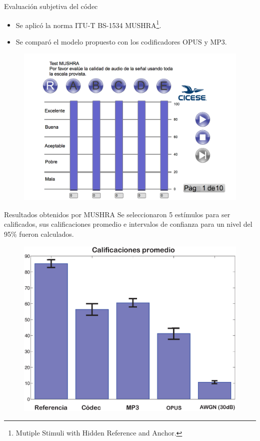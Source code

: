 \documentclass[xcolor=table]{beamer}
\begin{document}
\begin{frame}{Evaluaci\'on subjetiva del c\'odec}
	\begin{itemize}
		\item<2-> Se aplic\'o la norma ITU-T BS-1534 MUSHRA\footnote{\tiny{Mutiple Stimuli with Hidden Reference and Anchor.}}.
		\item<3-> Se compar\'o el modelo propuesto con los codificadores OPUS y MP3. 
	\end{itemize}\pause	
	\begin{figure}
		\centering
		\includegraphics[scale=0.2]{mushra_interfaz.png}
	\end{figure}
\end{frame}

\begin{frame}{Resultados obtenidos por MUSHRA}
Se seleccionaron 5 est\'imulos para ser calificados, sus calificaciones promedio e intervalos de confianza para un nivel del 95\% fueron calculados. 
	\begin{figure}
		\centering
		\includegraphics[scale=0.28]{CalifTotal.eps}
	\end{figure}
\end{frame}
\end{document}
